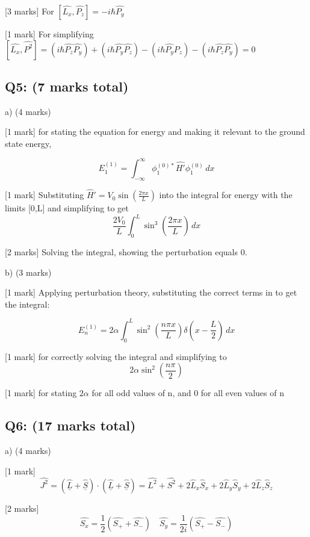 \documentclass[a4paper,11pt]{article}
\begin{document}
[3 marks] For \( [\hat{L_{x}}, \hat{P_{z}}] = -i\hbar\hat{P_{y}} \)

[1 mark] For simplifying \( [\hat{L_{x}}, \hat{P^{2}}] = (i\hbar\hat{P_{z}}\hat{P_{y}}) + (i\hbar\hat{P_{y}}\hat{P_{z}}) - (i\hbar\hat{P_{y}}\hat{P_{z}}) - (i\hbar\hat{P_{z}}\hat{P_{y}}) = 0 \)

\subsection*{Q5: (7 marks total)}

a) (4 marks)

[1 mark] for stating the equation for energy and making it relevant to the ground state energy, 

\[ E_{1}^{(1)} = \int_{-\infty}^{\infty} \phi_{1}^{(0)*}\hat{H'}\phi_{1}^{(0)} \, dx \]

[1 mark] Substituting \( \hat{H}' = V_{0} \sin\left(\frac{2 \pi x}{L} \right) \) into the integral for energy with the limits [0,L] and simplifying to get \[ \frac{2V_{0}}{L} \int_{0}^{L} \sin^{3}\left(\frac{2 \pi x}{L} \right) \, dx \]

[2 marks] Solving the integral, showing the perturbation equals 0.

b) (3 marks)

[1 mark] Applying perturbation theory, substituting the correct terms in to get the integral: 

\[ E_{n}^{(1)} = 2 \alpha \int_{0}^{L} \sin^{2}\left(\frac{n \pi x}{L} \right) \delta\left(x - \frac{L}{2} \right) \, dx \]

[1 mark] for correctly solving the integral and simplifying to 
\[ 2 \alpha \sin^{2}\left(\frac{n \pi}{2} \right) \]

[1 mark] for stating \(2 \alpha \) for all odd values of n, and 0 for all even values of n 

\subsection*{Q6: (17 marks total) }

a) (4 marks)

[1 mark] \[ \hat{J^{2}} = \left(\hat{\underline{L}} + \hat{\underline{S}} \right) \cdot \left(\hat{\underline{L}} + \hat{\underline{S}} \right) =  \hat{L^{2}} + \hat{S^{2}} + 2\hat{L}_{x}\hat{S}_{x} + 2\hat{L}_{y}\hat{S}_{y} + 2\hat{L}_{z}\hat{S}_{z} \]

[2 marks]  \[ \hat{S_{x}} = \frac{1}{2} (\hat{S_{+}} + \hat{S_{-}}) \quad \hat{S_{y}} = \frac{1}{2i} (\hat{S_{+}} - \hat{S_{-}}) \] 
\end{document}
